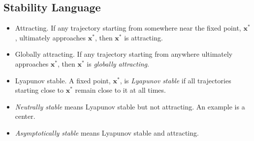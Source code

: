 \documentclass{book}
\begin{document}
\subsection{Stability Language}


\begin{itemize}

\item
Attracting.
If any trajectory starting from somewhere near the fixed point, $\mathbf x^*$, ultimately approaches $\mathbf x^*$, then $\mathbf x^*$ is attracting.

\item
Globally attracting.
If any trajectory starting from anywhere ultimately approaches $\mathbf x^*$, then $\mathbf x^*$ is \emph{globally attracting}.

\item
Lyapunov stable.
A fixed point, $\mathbf x^*$, is \emph{Lyapunov stable} if all trajectories starting close to $\mathbf x^*$ remain close to it at all times.

\item
\emph{Neutrally stable} means Lyapunov stable but not attracting.  An example is a center.

\item
\emph{Asymptotically stable} means Lyapunov stable and attracting.

\end{itemize}
\end{document}
